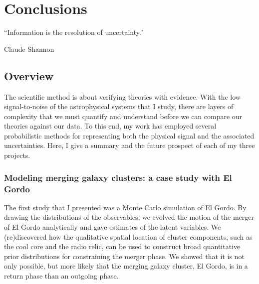\doublespacing

\setcounter{chapter}{4}
\chapter{Conclusions}{}{}
\label{chapter5}

\epigraph{``Information is the resolution of uncertainty."}{Claude Shannon}


\section{Overview}
The scientific method is about verifying theories with evidence.
With the low signal-to-noise of the astrophysical systems that I study, 
there are layers of complexity that we must quantify and understand
before we can compare our theories against our data.
To this end, my work has employed several probabilistic  
methods for representing both the physical signal and the associated uncertainties. 
Here, I give a summary and the future prospect of each of my three projects.   


\subsection{Modeling merging galaxy clusters: a case study with El
Gordo}
The first study that I presented was a Monte Carlo simulation of El Gordo.
By drawing the distributions of the observables,
we evolved the motion of the merger of El Gordo analytically
and gave estimates of the latent variables. 
We (re)discovered how the qualitative spatial location 
of cluster components, such as the cool core 
and the radio relic, can be used to construct   
broad quantitative prior distributions for 
constraining the merger phase.  
We showed that it is not only possible, 
but more likely that the merging galaxy cluster, El Gordo, is in a return phase
than an outgoing phase.       
 
